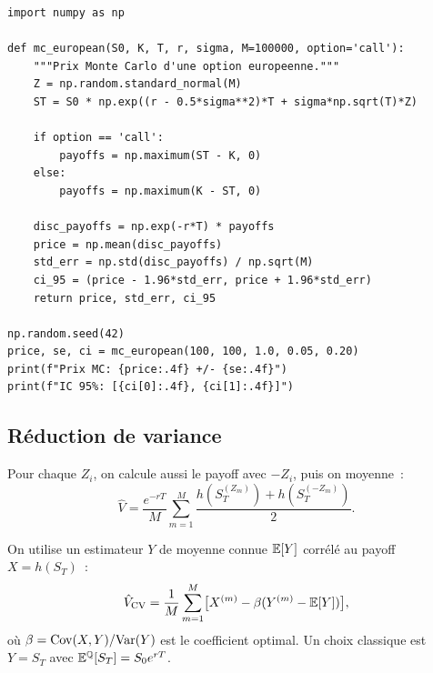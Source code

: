 \begin{codeblock}[title=\textbf{Monte Carlo pour un call europ\'een}]
\begin{verbatim}
import numpy as np

def mc_european(S0, K, T, r, sigma, M=100000, option='call'):
    """Prix Monte Carlo d'une option europeenne."""
    Z = np.random.standard_normal(M)
    ST = S0 * np.exp((r - 0.5*sigma**2)*T + sigma*np.sqrt(T)*Z)

    if option == 'call':
        payoffs = np.maximum(ST - K, 0)
    else:
        payoffs = np.maximum(K - ST, 0)

    disc_payoffs = np.exp(-r*T) * payoffs
    price = np.mean(disc_payoffs)
    std_err = np.std(disc_payoffs) / np.sqrt(M)
    ci_95 = (price - 1.96*std_err, price + 1.96*std_err)
    return price, std_err, ci_95

np.random.seed(42)
price, se, ci = mc_european(100, 100, 1.0, 0.05, 0.20)
print(f"Prix MC: {price:.4f} +/- {se:.4f}")
print(f"IC 95%: [{ci[0]:.4f}, {ci[1]:.4f}]")
\end{verbatim}
\end{codeblock}

\subsection{R\'eduction de variance}

\begin{definition}
Pour chaque $Z_i$, on calcule aussi le payoff avec $-Z_i$, puis on
moyenne~:
\[
    \hat{V} = \frac{e^{-rT}}{M}\sum_{m=1}^{M}
    \frac{h(S_T^{(Z_m)}) + h(S_T^{(-Z_m)})}{2}.
\]
\end{definition}

\begin{definition}
On utilise un estimateur $Y$ de moyenne connue $\mathbb{E}[Y]$ corr\'el\'e au
payoff $X = h(S_T)$~:
\[
    \hat{V}_{\text{CV}} = \frac{1}{M}\sum_{m=1}^{M}
    \bigl[X^{(m)} - \beta(Y^{(m)} - \mathbb{E}[Y])\bigr],
\]
o\`u $\beta = \mathrm{Cov}(X,Y)/\mathrm{Var}(Y)$ est le coefficient optimal.
Un choix classique est $Y = S_T$ avec $\mathbb{E}^\mathbb{Q}[S_T] = S_0 e^{rT}$.
\end{definition}

